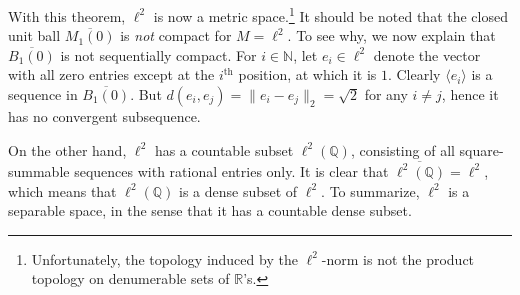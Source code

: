 With this theorem, $\ell^2$ is now a metric space.\footnote{Unfortunately, the topology induced by the $\ell^2$-norm is not the product topology on denumerable sets of $\mathbb{R}$'s.}
It should be noted that the closed unit ball $\overline{M_1(0)}$ is \textit{not} compact for $M = \ell^2$.
To see why, we now explain that $\overline{B_1(0)}$ is not sequentially compact.
For $i \in \mathbb{N}$, let $e_i \in \ell^2$ denote the vector with all zero entries except at the $i^\text{th}$ position, at which it is $1$.
Clearly $\langle e_i \rangle$ is a sequence in $\overline{B_1(0)}$.
But $d(e_i, e_j) = \| e_i - e_j \|_2 = \sqrt{2}$ for any $i \ne j$, hence it has no convergent subsequence.

On the other hand, $\ell^2$ has a countable subset $\ell^2(\mathbb{Q})$, consisting of all square-summable sequences with rational entries only.
It is clear that $\overline{\ell^2(\mathbb{Q})} = \ell^2$, which means that $\ell^2(\mathbb{Q})$ is a \textsf{dense} subset of $\ell^2$.
To summarize, $\ell^2$ is a \textsf{separable} space, in the sense that it has a countable dense subset.
